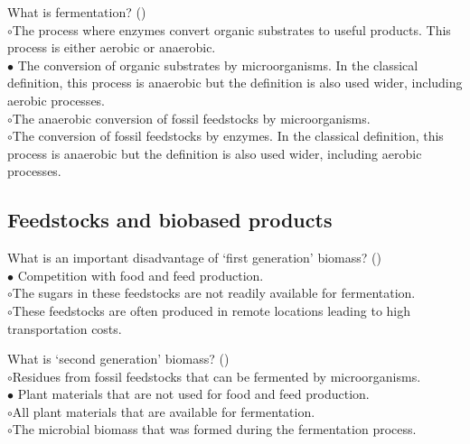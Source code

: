 \documentclass[]{beamer}
\begin{document}
\begin{CJK}{UTF8}{gbsn}
\begin{frame}[shrink] {} 
\addtocounter{questions}{1}
\color{blue}
  What is fermentation? 
 ({})\\
\color{black}
\setlength{\parindent}{-0.4cm}
{\color{red}$\circ$}The process where enzymes convert organic substrates to useful products. This process is either aerobic or anaerobic.  \\
{\color{red}$\bullet$} The conversion of organic substrates by microorganisms. In the classical definition, this process is anaerobic but the definition is also used wider, including aerobic processes.  \\
{\color{red}$\circ$}The anaerobic conversion of fossil feedstocks by microorganisms.  \\
{\color{red}$\circ$}The conversion of fossil feedstocks by enzymes. In the classical definition, this process is anaerobic but the definition is also used wider, including aerobic processes.  \\

\end{frame}
\subsection{Feedstocks and biobased products }
\setcounter{questions}{0}


\begin{frame}[shrink] {} 
\addtocounter{questions}{1}
\color{blue}
  What is an important disadvantage of ‘first generation’ biomass?
 ({})\\
\color{black}
\setlength{\parindent}{-0.4cm}
{\color{red}$\bullet$} Competition with food and feed production.  \\
{\color{red}$\circ$}The sugars in these feedstocks are not readily available for fermentation.  \\
{\color{red}$\circ$}These feedstocks are often produced in remote locations leading to high transportation costs.  \\
\end{frame}


\begin{frame}[shrink] {} 
\addtocounter{questions}{1}
\color{blue}
  What is ‘second generation’ biomass?
 ({})\\
\color{black}
\setlength{\parindent}{-0.4cm}
{\color{red}$\circ$}Residues from fossil feedstocks that can be fermented by microorganisms.  \\
{\color{red}$\bullet$} Plant materials that are not used for food and feed production.  \\
{\color{red}$\circ$}All plant materials that are available for fermentation.  \\
{\color{red}$\circ$}The microbial biomass that was formed during the fermentation process.  \\
\end{frame}



\end{CJK}
\end{document}
